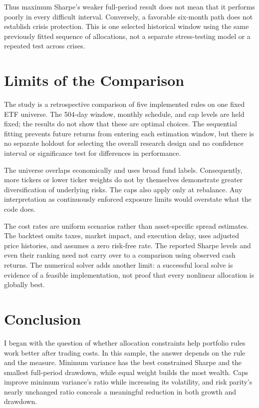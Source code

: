 \documentclass[conference]{IEEEtran}
\begin{document}
Thus maximum Sharpe's weaker full-period result does not mean that it performs poorly in every difficult interval. Conversely, a favorable six-month path does not establish crisis protection. This is one selected historical window using the same previously fitted sequence of allocations, not a separate stress-testing model or a repeated test across crises.

\section{Limits of the Comparison}
The study is a retrospective comparison of five implemented rules on one fixed ETF universe. The 504-day window, monthly schedule, and cap levels are held fixed; the results do not show that these are optimal choices. The sequential fitting prevents future returns from entering each estimation window, but there is no separate holdout for selecting the overall research design and no confidence interval or significance test for differences in performance.

The universe overlaps economically and uses broad fund labels. Consequently, more tickers or lower ticker weights do not by themselves demonstrate greater diversification of underlying risks. The caps also apply only at rebalance. Any interpretation as continuously enforced exposure limits would overstate what the code does.

The cost rates are uniform scenarios rather than asset-specific spread estimates. The backtest omits taxes, market impact, and execution delay, uses adjusted price histories, and assumes a zero risk-free rate. The reported Sharpe levels and even their ranking need not carry over to a comparison using observed cash returns. The numerical solver adds another limit: a successful local solve is evidence of a feasible implementation, not proof that every nonlinear allocation is globally best.

\section{Conclusion}
I began with the question of whether allocation constraints help portfolio rules work better after trading costs. In this sample, the answer depends on the rule and the measure. Minimum variance has the best constrained Sharpe and the smallest full-period drawdown, while equal weight builds the most wealth. Caps improve minimum variance's ratio while increasing its volatility, and risk parity's nearly unchanged ratio conceals a meaningful reduction in both growth and drawdown.
\end{document}
